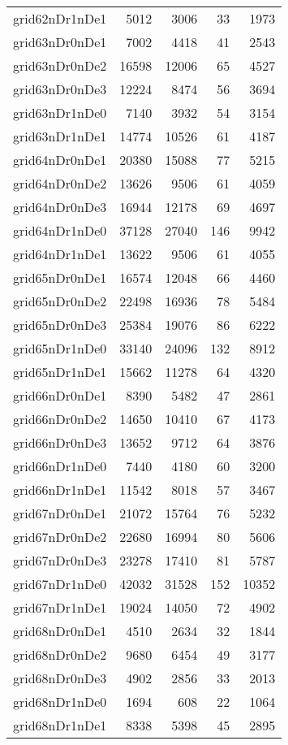 \begin{tabular}{lrrrr}
grid62nDr1nDe1 & 5012 & 3006 & 33 & 1973 \\
grid63nDr0nDe1 & 7002 & 4418 & 41 & 2543 \\
grid63nDr0nDe2 & 16598 & 12006 & 65 & 4527 \\
grid63nDr0nDe3 & 12224 & 8474 & 56 & 3694 \\
grid63nDr1nDe0 & 7140 & 3932 & 54 & 3154 \\
grid63nDr1nDe1 & 14774 & 10526 & 61 & 4187 \\
grid64nDr0nDe1 & 20380 & 15088 & 77 & 5215 \\
grid64nDr0nDe2 & 13626 & 9506 & 61 & 4059 \\
grid64nDr0nDe3 & 16944 & 12178 & 69 & 4697 \\
grid64nDr1nDe0 & 37128 & 27040 & 146 & 9942 \\
grid64nDr1nDe1 & 13622 & 9506 & 61 & 4055 \\
grid65nDr0nDe1 & 16574 & 12048 & 66 & 4460 \\
grid65nDr0nDe2 & 22498 & 16936 & 78 & 5484 \\
grid65nDr0nDe3 & 25384 & 19076 & 86 & 6222 \\
grid65nDr1nDe0 & 33140 & 24096 & 132 & 8912 \\
grid65nDr1nDe1 & 15662 & 11278 & 64 & 4320 \\
grid66nDr0nDe1 & 8390 & 5482 & 47 & 2861 \\
grid66nDr0nDe2 & 14650 & 10410 & 67 & 4173 \\
grid66nDr0nDe3 & 13652 & 9712 & 64 & 3876 \\
grid66nDr1nDe0 & 7440 & 4180 & 60 & 3200 \\
grid66nDr1nDe1 & 11542 & 8018 & 57 & 3467 \\
grid67nDr0nDe1 & 21072 & 15764 & 76 & 5232 \\
grid67nDr0nDe2 & 22680 & 16994 & 80 & 5606 \\
grid67nDr0nDe3 & 23278 & 17410 & 81 & 5787 \\
grid67nDr1nDe0 & 42032 & 31528 & 152 & 10352 \\
grid67nDr1nDe1 & 19024 & 14050 & 72 & 4902 \\
grid68nDr0nDe1 & 4510 & 2634 & 32 & 1844 \\
grid68nDr0nDe2 & 9680 & 6454 & 49 & 3177 \\
grid68nDr0nDe3 & 4902 & 2856 & 33 & 2013 \\
grid68nDr1nDe0 & 1694 & 608 & 22 & 1064 \\
grid68nDr1nDe1 & 8338 & 5398 & 45 & 2895 \\

\end{tabular}
